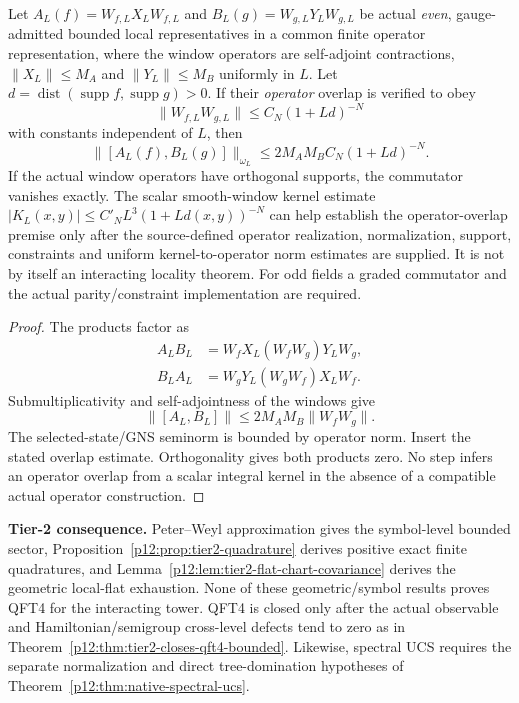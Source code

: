 \documentclass[12pt,a4paper]{article}
\begin{document}
\begin{lemma}
\label{p12:lem:tier2-asymptotic-locality}
Let \(A_L(f)=W_{f,L}X_LW_{f,L}\) and
\(B_L(g)=W_{g,L}Y_LW_{g,L}\) be actual \emph{even}, gauge-admitted
bounded local representatives in a common finite operator representation,
where the window operators are self-adjoint contractions,
\(\|X_L\|\le M_A\) and \(\|Y_L\|\le M_B\) uniformly in \(L\).
Let \(d=\operatorname{dist}(\operatorname{supp}f,
\operatorname{supp}g)>0\). If their \emph{operator} overlap is
verified to obey
\[
 \|W_{f,L}W_{g,L}\|\le C_N(1+Ld)^{-N}
\]
with constants independent of \(L\), then
\begin{equation}
\label{p12:eq:tier2-asymptotic-locality}
\boxed{\|[A_L(f),B_L(g)]\|_{\omega_L}
 \le2M_AM_BC_N(1+Ld)^{-N}.}
\end{equation}
If the actual window operators have orthogonal supports, the commutator
vanishes exactly. The scalar smooth-window kernel estimate
\(|K_L(x,y)|\le C'_NL^3(1+Ld(x,y))^{-N}\) can help establish the
operator-overlap premise only after the source-defined operator realization,
normalization, support, constraints and uniform kernel-to-operator norm
estimates are supplied. It is not by itself an interacting locality theorem.
For odd fields a graded commutator and the actual parity/constraint
implementation are required.
\end{lemma}
\begin{proof}
The products factor as
\[
\begin{aligned}
A_LB_L&=W_fX_L(W_fW_g)Y_LW_g,\\
B_LA_L&=W_gY_L(W_gW_f)X_LW_f.
\end{aligned}
\]
Submultiplicativity and self-adjointness of the windows give
\[
\|[A_L,B_L]\|\le2M_AM_B\|W_fW_g\|.
\]
The selected-state/GNS seminorm is bounded by operator norm. Insert the
stated overlap estimate. Orthogonality gives both products zero.
No step infers an operator overlap from a scalar integral kernel in the
absence of a compatible actual operator construction.
\end{proof}


\textbf{Tier-2 consequence.}
Peter--Weyl approximation gives the symbol-level bounded sector, Proposition~\ref{p12:prop:tier2-quadrature} derives positive exact finite quadratures, and Lemma~\ref{p12:lem:tier2-flat-chart-covariance} derives the geometric local-flat exhaustion.  None of these geometric/symbol results proves QFT4 for the interacting tower.  QFT4 is closed only after the actual observable and Hamiltonian/semigroup cross-level defects tend to zero as in Theorem~\ref{p12:thm:tier2-closes-qft4-bounded}.  Likewise, spectral UCS requires the separate normalization and direct tree-domination hypotheses of Theorem~\ref{p12:thm:native-spectral-ucs}.
\end{document}
